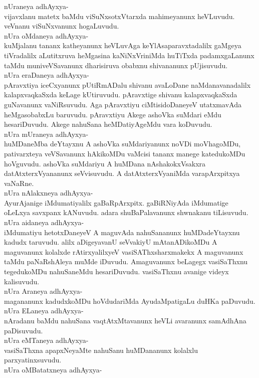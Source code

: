 \documentclass{article}
\begin{document}
nUraneya adhAyxya-\\
vijavxlanu matetx baMdu viSuNxsotxVtarxda mahimeyanunx heVLuvudu. veVnanu viSuNxvanunx hogaLuvudu.\\
nUra oMdaneya adhAyxya-\\
kuMjalanu tananx katheyanunx heVLuvAga keYlAsaparavxtadalilx gaMgeya tiVradalilx aLutitxruva heMgasina kaNiNxVriniMda huTiTxda padamxgaLanunx taMdu muniveVSavanunx dharisiruva obabxnu shivananunx pUjisuvudu.\\
nUra eraDaneya adhAyxya-\\
pAravxtiya iceCxyanunx pUtiRmADalu shivanu avaLoDane naMdanavanadalilx kalapxvaqkaSxda keLage kUtiruvudu. pAravxtige shivanu kalapxvaqkaSxda guNavanunx vaNiRsuvudu. Aga pAravxtiyu ciMtisidoDaneyeV utatxmavAda heMgasobabxLu baruvudu. pAravxtiyu Akege ashoVka suMdari eMdu hesariDuvudu. Akege nahuSana heMDatiyAgeMdu vara koDuvudu.\\
nUra mUraneya adhAyxya-\\
huMDaneMba deYtayxnu A ashoVka suMdariyanunx noVDi moVhagoMDu, pativarxteya veVSavanunx hAkikoMDu vaMcisi tananx manege katedukoMDu hoVguvudu. ashoVka suMdariyu A huMDana nAshakokxVsakxra datAtxterxVyananunx seVvisuvudu. A datAtxterxVyaniMda varapArxpitxya vaNaRne.\\
nUra nAlakxneya adhAyxya-\\
AyurAjanige iMdumatiyalilx gaBaRpArxpitx. gaBiRNiyAda iMdumatige oLeLxya savxpanx kANuvudu. adara shuBaPalavanunx shwnakanu tiLisuvudu.\\
nUra aidaneya adhAyxya-\\
iMdumatiyu hetotxDaneyeV A maguvAda nahuSananunx huMDadeYtayxnu kadudx taruvudu. alilx aDigeyavanU seVvakiyU mAtanADikoMDu A maguvanunx kolalxde rAtirxyalilxyeV vasiSAThxsharxmakekx A maguvanunx taMdu paNaRshAleya muMde iDuvudu. Amaguvanunx beLagegx vasiSaThxnu tegedukoMDu nahuSaneMdu hesariDuvudu. vasiSaThxnu avanige videyx kalisuvudu.\\
nUra Araneya adhAyxya-\\
magananunx kadudxkoMDu hoVdudariMda AyudaMpatigaLu duHKa paDuvudu.\\
nUra ELaneya adhAyxya-\\
nAradanu baMdu nahuSana vaqtAtxMtavanunx heVLi avaranunx samAdhAna paDisuvudu.\\
nUra eMTaneya adhAyxya-\\
vasiSaThxna apapxNeyaMte nahuSanu huMDananunx kolalxlu parxyatinxsuvudu.\\
nUra oMBatatxneya adhAyxya-\\
\end{document}
